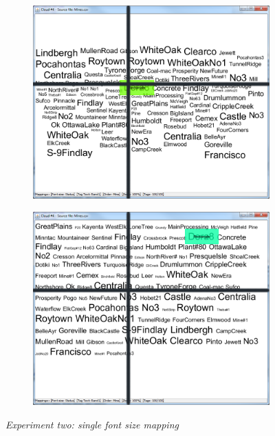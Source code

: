 \begin{figure}[!htb]
\begin{subfigure}{.5\textwidth}
  \includegraphics[scale=0.25]{Experiment2/T4/M1Spiral.png}
\end{subfigure}%
\begin{subfigure}{.5\textwidth}
  \centering
  \includegraphics[scale=0.25]{Experiment2/T4/M1Typewriter.png}
\end{subfigure}
\caption{\textit{Experiment two: single font size mapping}}
\end{figure}



